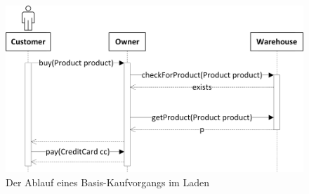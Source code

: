 \begin{figure}[h]
	\centering
  	\includegraphics[width=1\textwidth]{images/szenario_seq.png}
	\caption{Der Ablauf eines Basis-Kaufvorgangs im Laden}
	\label{img:szenario:seq}
\end{figure}

